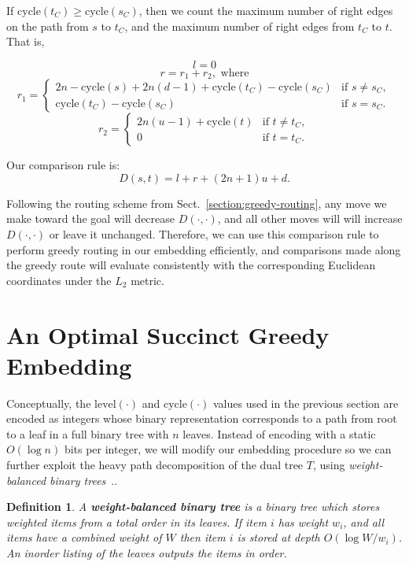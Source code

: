 \documentclass[11pt]{article}
\newtheorem{definition}[theorem]{Definition}
\newcommand{\cycle}{\mathrm{cycle}}
\newcommand{\level}{\mathrm{level}}
\begin{document}
If $\cycle(t_C) \geq \cycle(s_C)$, then we count the maximum number of right 
edges on the path from $s$ to $t_C$, and the maximum number of right edges 
from $t_C$ to $t$. That is,

{\small
\[l = 0\]
\[r = r_1 + r_2,\text{ where}\]
\[r_1 = \begin{cases}
       2n-\cycle(s) + 2n(d-1) + \cycle(t_C) - \cycle(s_C) &\text{if $s \neq s_C$}, \\
       \cycle(t_C) - \cycle(s_C) &\text{if $s = s_C$}. \end{cases}\]
\[r_2 = \begin{cases}
        2n(u-1) + \cycle(t) &\text{if $t \neq t_C$}, \\
        0&\text{if $t = t_C$}. \end{cases}\]
}

Our comparison rule is:
\[D(s,t) = l + r + (2n+1)u + d.\]

Following the routing scheme from Sect.~\ref{section:greedy-routing}, any 
move we make toward the goal will decrease $D(\cdot,\cdot)$, and all other
moves will will increase $D(\cdot,\cdot)$ or leave it unchanged. 
Therefore, we can use this comparison rule to perform greedy routing 
in our embedding efficiently, and comparisons made along the greedy route
will evaluate consistently with the corresponding Euclidean coordinates 
under the $L_2$ metric.

\section{An Optimal Succinct Greedy Embedding}
Conceptually, the $\level(\cdot)$ and $\cycle(\cdot)$ values used
in the previous section are 
encoded as integers whose binary representation corresponds to
a path from root to a leaf in a full binary tree with $n$ leaves. Instead 
of encoding with a static $O(\log{n})$ bits per integer, we will 
modify our embedding procedure so we can further exploit the heavy path 
decomposition of the dual tree $T$, using 
\emph{weight-balanced binary trees}~\ifFull\cite{GilMoo-BSTJ-59,Knu-AI-71}.\else \cite{Knu-AI-71}.\fi

\begin{definition} A {\bfseries weight-balanced binary tree} is a binary tree
which stores weighted items from a total order in its leaves. If item $i$
has weight $w_i$, and all items have a combined weight of $W$ then item 
$i$ is stored at depth $O(\log{W/w_i})$. An inorder listing of the leaves outputs
the items in order.
\end{definition}
\end{document}

